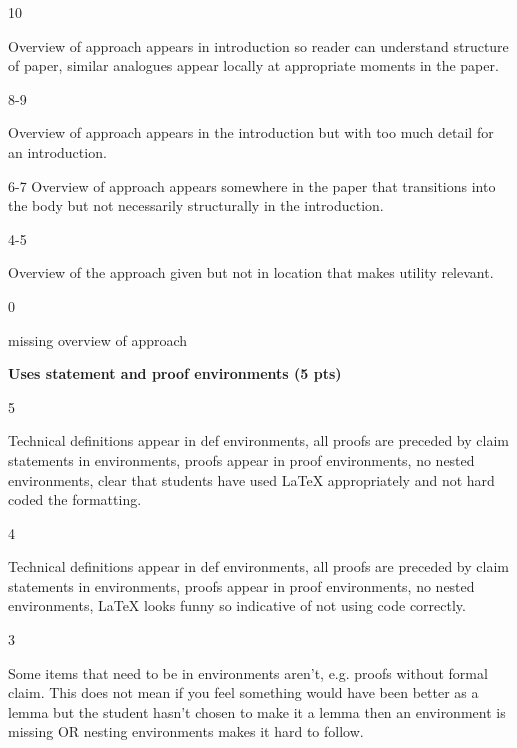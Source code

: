 \documentclass{article}
\begin{document}
    10
    \par
    Overview of approach appears in introduction so reader can
    understand structure of paper, similar analogues appear locally
    at appropriate moments in the paper.
    \par\hfill\par
    8-9
    \par
    Overview of approach appears in the introduction but with too
    much detail for an introduction.
    \par\hfill\par
    6-7
    Overview of approach appears somewhere in the paper that
    transitions into the body but not necessarily structurally
    in the introduction.
    \par\hfill\par
    4-5
    \par
    Overview of the approach given but not in location
    that makes utility relevant.
    \par\hfill\par
    0
    \par
    missing overview of approach
    \par\hfill\par
    \textbf{Uses statement and proof environments (5 pts)}
    \par\hfill\par
    5
    \par
    Technical definitions appear in def environments, all proofs are
    preceded by claim statements in environments, proofs appear in proof
    environments, no nested environments, clear that students have used
    LaTeX appropriately and not hard coded the formatting.
    \par\hfill\par
    4
    \par
    Technical definitions appear in def environments, all proofs are
    preceded by claim statements in environments, proofs appear in proof
    environments, no nested environments, LaTeX looks funny so indicative
    of not using code correctly.
    \par\hfill\par
    3
    \par
    Some items that need to be in environments aren't, e.g. proofs
    without formal claim. This does not mean if you feel something
    would have been better as a lemma but the student hasn't chosen
    to make it a lemma then an environment is missing OR nesting
    environments makes it hard to follow.
\end{document}
